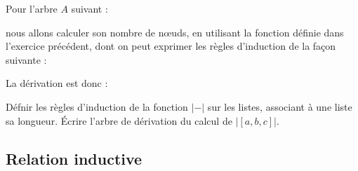 \begin{expl}
    Pour l'arbre $A$ suivant :
    \begin{center}
    \end{center}
    nous allons calculer son nombre de n\oe uds, en utilisant la fonction définie dans l'exercice précédent, dont on peut exprimer les règles d'induction de la façon suivante : 
    \begin{center}
        \begin{prooftree}
        \end{prooftree}
        \qquad
        \begin{prooftree}
        \end{prooftree}
    \end{center}

    La dérivation est donc :
    \begin{center}
        \begin{prooftree}
        \end{prooftree}
    \end{center}
\end{expl}


\begin{exo}
    Défnir les règles d'induction de la fonction $|-|$ sur les listes, associant à une liste sa longueur. \'Ecrire l'arbre de dérivation du calcul de $|[a,b,c]|$.
\end{exo}



\subsection{Relation inductive}

